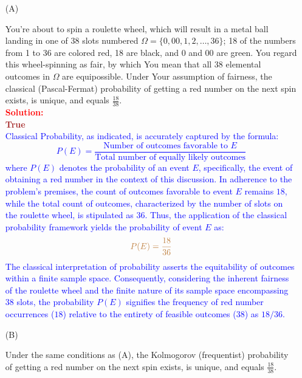 \documentclass[12pt]{article}
\begin{document}
\begin{itemize}

\item[(A)]

You're about to spin a roulette wheel, which will result in a metal ball
landing in one of 38 slots numbered $\Omega = \{ 0, 00, 1, 2, \dots, 36
\}$; 18 of the numbers from 1 to 36 are colored red, 18 are black, and 0
and 00 are green. You regard this wheel-spinning as fair, by which You mean
that all 38 elemental outcomes in $\Omega$ are equipossible. Under Your
assumption of fairness, the classical (Pascal-Fermat) probability of
getting a red number on the next spin exists, is unique, and equals $\frac{
18 }{ 38 }$. \\
\textcolor{red}{\textbf{Solution:}} \\
\textbf{\textcolor{brown}{True}} \\
\textcolor{blue}{
Classical Probability, as indicated, is accurately captured by the formula:
\[ P(E) = \frac{\text{Number of outcomes favorable to } E}{\text{Total number of equally likely outcomes}} \]
where \textcolor{blue}{\(P(E)\)} denotes the probability of an event \textcolor{blue}{\(E\)}, specifically, the event of obtaining a red number in the context of this discussion.
In adherence to the problem's premises, the count of outcomes favorable to event \textcolor{blue}{\(E\)} remains \textcolor{blue}{\(18\)}, while the total count of outcomes, characterized by the number of slots on the roulette wheel, is stipulated as \textcolor{blue}{\(36\)}.
Thus, the application of the classical probability framework yields the probability of event \textcolor{blue}{\(E\)} as:
\[ \textcolor{brown}{P(E) = \frac{18}{36}} \]
The classical interpretation of probability asserts the equitability of outcomes within a finite sample space. Consequently, considering the inherent fairness of the roulette wheel and the finite nature of its sample space encompassing \textcolor{blue}{\(38\)} slots, the probability \textcolor{blue}{\(P(E)\)} signifies the frequency of red number occurrences (\textcolor{blue}{\(18\)}) relative to the entirety of feasible outcomes (\textcolor{blue}{\(38\)}) as \textcolor{blue}{\(18/36\)}.
}
\item[(B)]

Under the same conditions as (A), the Kolmogorov (frequentist) probability
of getting a red number on the next spin exists, is unique, and equals
$\frac{ 18 }{ 38 }$.


\end{itemize}
\end{document}
